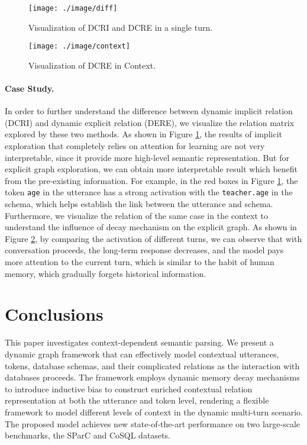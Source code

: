 \documentclass[letterpaper]{article} \usepackage{aaai21}  \usepackage{times}  \usepackage{helvet} \usepackage{courier}  \usepackage[hyphens]{url}  \usepackage{graphicx} \urlstyle{rm} \def\UrlFont{\rm}  \usepackage{natbib}  \usepackage{caption} \frenchspacing  \setlength{\pdfpagewidth}{8.5in}  \setlength{\pdfpageheight}{11in}
\begin{document}
\begin{figure}
	\centering
	\texttt{[image: ./image/diff]}
	\caption{Visualization of DCRI and DCRE in a single turn.}
	\label{diff}
\end{figure}

\begin{figure}
	\centering
	\texttt{[image: ./image/context]}
	\caption{Visualization of DCRE in Context.}
	\label{ex_context}
\end{figure}

\paragraph{Case Study.} In order to further understand the difference between dynamic implicit relation (DCRI) and dynamic explicit relation (DERE), we visualize the relation matrix explored by these two methods. 
As shown in Figure \ref{diff}, the results of implicit exploration that completely relies on attention for learning are not very interpretable, since it provide more high-level semantic representation.
But for explicit graph exploration, we can obtain more interpretable result which benefit from the pre-existing information.
For example, in the red boxes in Figure \ref{diff}, the token \texttt{age} in the utterance has a strong activation with the \texttt{teacher.age} in the schema, which helps establish the link between the utterance and schema.
Furthermore, we visualize the relation of the same case in the context to understand the influence of decay mechanism on the explicit graph.
As shown in Figure \ref{ex_context}, by comparing the activation of different turns, we can observe that with conversation proceeds, the long-term response decreases, and the model pays more attention to the current turn, which is similar to the habit of human memory, which gradually forgets historical information.

\section{Conclusions}
This paper investigates context-dependent semantic parsing. We present a dynamic graph framework that can effectively model contextual utterances, tokens, database schemas, and their complicated relations as the interaction with databases proceeds.
The framework employs dynamic memory decay mechanisms to introduce inductive bias to construct enriched contextual relation representation at both the utterance and token level, rendering a flexible framework to model different levels of context in the dynamic multi-turn scenario. The proposed model achieves new state-of-the-art  performance on two large-scale benchmarks, the SParC and CoSQL datasets. 
\end{document}
